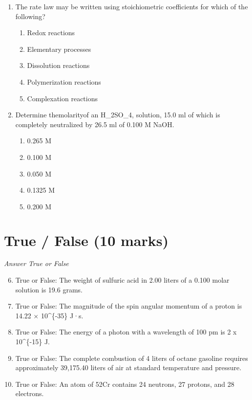 \documentclass[12pt]{article}
\begin{document}
\begin{enumerate}[label=\arabic*.]
\begin{enumerate}[label=(\alph*)]
\end{enumerate}
\item The rate law may be written using stoichiometric coefficients for which of the following?
\begin{enumerate}[label=(\alph*)]
    \item Redox reactions
    \item Elementary processes
    \item Dissolution reactions
    \item Polymerization reactions
    \item Complexation reactions
\end{enumerate}
\item Determine themolarityof an H\_2SO\_4, solution, 15.0 ml of which is completely neutralized
by 26.5 ml of 0.100 M NaOH.
\begin{enumerate}[label=(\alph*)]
    \item 0.265 M
    \item 0.100 M
    \item 0.050 M
    \item 0.1325 M
    \item 0.200 M
\end{enumerate}
\end{enumerate}

\section*{True / False (10 marks)}
\textit{Answer True or False}
\begin{enumerate}[label=\arabic*.]
\setcounter{enumi}{5}
\item True or False: The weight of sulfuric acid in 2.00 liters of a 0.100 molar solution is 19.6 grams.
\item True or False: The magnitude of the spin angular momentum of a proton is 14.22 × 10\^{}\{-35\} J·s.
\item True or False: The energy of a photon with a wavelength of 100 pm is 2 x 10\^{}\{-15\} J.
\item True or False: The complete combustion of 4 liters of octane gasoline requires approximately 39,175.40 liters of air at standard temperature and pressure.
\item True or False: An atom of 52Cr contains 24 neutrons, 27 protons, and 28 electrons.
\end{enumerate}
\end{document}
